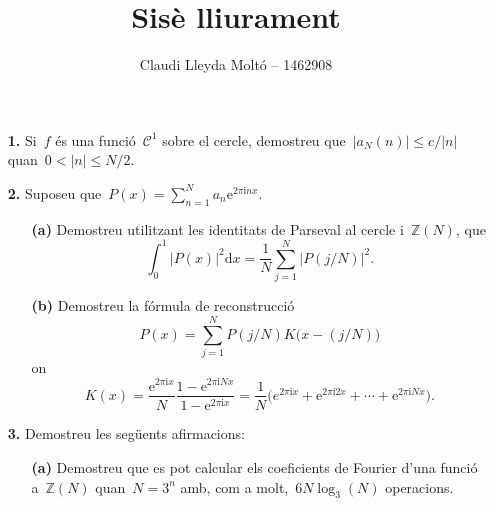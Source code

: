 \documentclass[a4paper]{article}
\title{Sisè lliurament}
\author{Claudi Lleyda Moltó -- 1462908}
\theoremstyle{plain}
\theoremstyle{definition}
\newcommand{\iu}{\mathrm{i}}
\newcommand{\e}{\mathrm{e}}
\providecommand{\uppi}{\pi}
\newcommand{\diff}{\mathrm{d}}
\newcommand{\abs}[1]{\lvert{#1}\rvert}
\newcommand{\ZZ}{\mathbb{Z}}
\begin{document}
\maketitle

\begin{enumerate}
    \item[\textbf{1.}] Si~\(f\) és una funció~\(\mathcal{C}^{1}\) sobre el
        cercle, demostreu que~\(\abs{a_{N}(n)}\leq c/\abs{n}\)
        quan~\(0<\abs{n}\leq N/2\).
\end{enumerate}

\begin{enumerate}
    \item[\textbf{2.}] Suposeu
        que~\(\displaystyle P(x)=\sum_{n=1}^{N}a_{n}\e^{2\uppi\iu nx}\).
        \begin{enumerate}
            \item[\textbf{(a)}] Demostreu utilitzant les identitats de Parseval
                al cercle i~\(\ZZ(N)\), que
                \[
                    \int_{0}^{1}
                    \abs{P(x)}^{2}
                    \diff x
                    =
                    \frac{1}{N}
                    \sum_{j=1}^{N}
                    \abs{P(j/N)}^{2}.
                \]
        \end{enumerate}
\end{enumerate}

\begin{enumerate}
    \item[]\begin{enumerate}
            \item[\textbf{(b)}] Demostreu la fórmula de reconstrucció
                \[
                    P(x)
                    =
                    \sum_{j=1}^{N}
                    P(j/N)
                    K\bigl(x-(j/N)\bigr)
                \]
                on
                \[
                    K(x)
                    =
                    \frac{\e^{2\uppi\iu x}}{N}
                    \frac{1-\e^{2\uppi\iu Nx}}{1-\e^{2\uppi\iu x}}
                    =
                    \frac{1}{N}
                    \bigl(
                        e^{2\uppi\iu x}
                        +
                        \e^{2\uppi\iu2x}
                        + \cdots +
                        \e^{2\uppi\iu Nx}
                    \bigr).
                \]
        \end{enumerate}
\end{enumerate}

\begin{enumerate}
    \item[\textbf{3.}] Demostreu les següents afirmacions:
        \begin{enumerate}
            \item[\textbf{(a)}] Demostreu que es pot calcular els coeficients de
                Fourier d'una funció a~\(\ZZ(N)\) quan~\(N=3^{n}\) amb, com a
                molt,~\(6N\log_{3}(N)\) operacions.
        \end{enumerate}
\end{enumerate}
\end{document}
